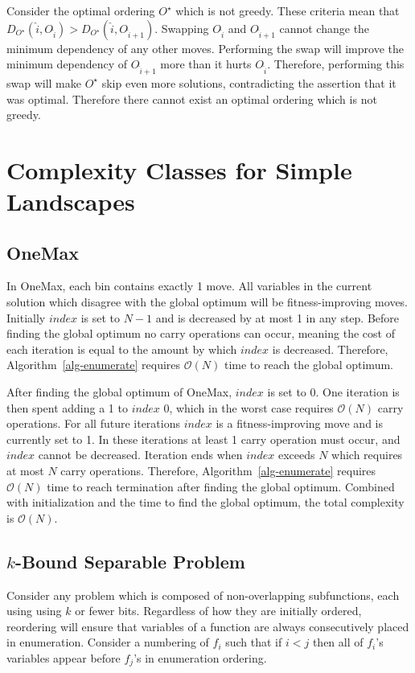 \documentclass[runningheads,a4paper]{llncs}
\newcommand{\BigO}[1]{$\mathcal{O}{(#1)}$}
\begin{document}
Consider the optimal ordering $O^\star$ which is not greedy.
These criteria mean that $D_{O^\star}(\hat{i}, O_{\hat{i}}) > D_{O^\star}(\hat{i}, O_{\hat{i}+1})$.
Swapping $O_{\hat{i}}$ and $O_{\hat{i}+1}$ cannot change the minimum dependency of any other moves.
Performing the swap will improve the minimum dependency of $O_{\hat{i}+1}$ more than it hurts
$O_{\hat{i}}$. Therefore, performing this swap will make $O^\star$ skip even more solutions,
contradicting the assertion that it was optimal. Therefore there cannot exist an optimal ordering which is not greedy.

\section{Complexity Classes for Simple Landscapes}

\subsection{OneMax}
In OneMax, each bin contains exactly 1 move. All variables in the current solution
which disagree with the global optimum will be fitness-improving moves.
Initially $index$ is set to $N-1$ and is decreased by at most 1 in any step.
Before finding the global optimum no carry operations can occur, meaning the
cost of each iteration is equal to the amount by which $index$ is decreased.
Therefore, Algorithm~\ref{alg-enumerate} requires \BigO{N} time to reach
the global optimum.

After finding the global optimum of OneMax, $index$ is set to 0. One iteration
is then spent adding a 1 to $index$ 0, which in the worst case requires \BigO{N}
carry operations. For all future iterations $index$ is a fitness-improving move
and is currently set to 1. In these iterations at least 1 carry operation must
occur, and $index$ cannot be decreased. Iteration ends when $index$ exceeds $N$
which requires at most $N$ carry operations. Therefore, Algorithm~\ref{alg-enumerate}
requires \BigO{N} time to reach termination after finding the global optimum. Combined
with initialization and the time to find the global optimum, the total complexity is \BigO{N}.

\subsection{$k$-Bound Separable Problem}
Consider any problem which is composed of non-overlapping
subfunctions, each using using $k$ or fewer bits. Regardless
of how they are initially ordered, reordering will ensure that
variables of a function are always consecutively placed in enumeration.
Consider a numbering of $f_i$ such that if $i < j$ then all of $f_i$'s
variables appear before $f_j$'s in enumeration ordering.
\end{document}
